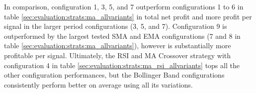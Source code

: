 In comparison, configuration 1, 3, 5, and 7 outperform configurations 1 to 6 in table \ref{sec:evaluation:strats:ma_allvariants} in total net profit and more profit per signal in the larger period configurations (3, 5, and 7). Configuration 9 is outperformed by the largest tested SMA and EMA configurations (7 and 8 in table \ref{sec:evaluation:strats:ma_allvariants}), however is substantially more profitable per signal. Ultimately, the RSI and MA Crossover strategy with configuration 4 in table \ref{sec:evaluation:strats:ma_rsi_allvariants} tops all the other configuration performances, but the Bollinger Band configurations consistently perform better on average using all its variations. 
